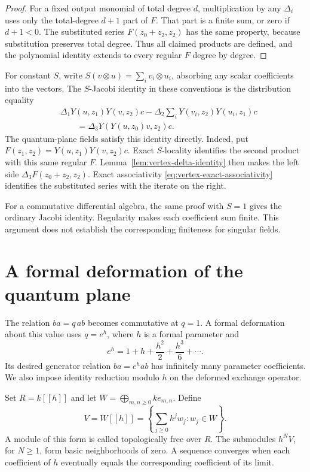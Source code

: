 \begin{proof}
For a fixed output monomial of total degree $d$, multiplication by
any $\Delta_i$ uses only the total-degree $d+1$ part of $F$.
That part is a finite sum, or zero if $d+1<0$.
The substituted series $F(z_0+z_2,z_2)$ has the same property,
because substitution preserves total degree.
Thus all claimed products are defined, and the polynomial identity
extends to every regular $F$ degree by degree.
\end{proof}

For constant $S$, write $S(v\otimes u)=\sum_i v_i\otimes u_i$,
absorbing any scalar coefficients into the vectors.
The $S$-Jacobi identity in these conventions is the distribution equality
\begin{equation}\label{eq:vertex-s-jacobi}
 \begin{aligned}
 &\Delta_1Y(u,z_1)Y(v,z_2)c
   -\Delta_2\sum_iY(v_i,z_2)Y(u_i,z_1)c\\
 &\qquad=\Delta_3Y(Y(u,z_0)v,z_2)c.
 \end{aligned}
\end{equation}
The quantum-plane fields satisfy this identity directly.
Indeed, put $F(z_1,z_2)=Y(u,z_1)Y(v,z_2)c$.
Exact $S$-locality identifies the second product with this same regular $F$.
Lemma~\ref{lem:vertex-delta-identity} then makes the left side
$\Delta_3F(z_0+z_2,z_2)$.
Exact associativity \eqref{eq:vertex-exact-associativity} identifies
the substituted series with the iterate on the right.

For a commutative differential algebra, the same proof with $S=1$
gives the ordinary Jacobi identity.
Regularity makes each coefficient sum finite.
This argument does not establish the corresponding finiteness for singular fields.

\section{A formal deformation of the quantum plane}
\label{sec:vertex-hadic}

The relation $ba=q\,ab$ becomes commutative at $q=1$.
A formal deformation about this value uses $q=e^h$, where
$h$ is a formal parameter and
\[
 e^h=1+h+\frac{h^2}{2}+\frac{h^3}{6}+\cdots.
\]
Its desired generator relation $ba=e^h ab$ has infinitely many
parameter coefficients.
We also impose identity reduction modulo $h$ on the deformed
exchange operator.

Set $R=k[[h]]$ and let $W=\bigoplus_{m,n\geq0}k e_{m,n}$.
Define
\[
 V=W[[h]]=\left\{\sum_{j\geq0}h^jw_j:w_j\in W\right\}.
\]
A module of this form is called topologically free over $R$.
The submodules $h^NV$, for $N\geq1$, form basic neighborhoods of zero.
A sequence converges when each coefficient of $h$ eventually equals
the corresponding coefficient of its limit.


